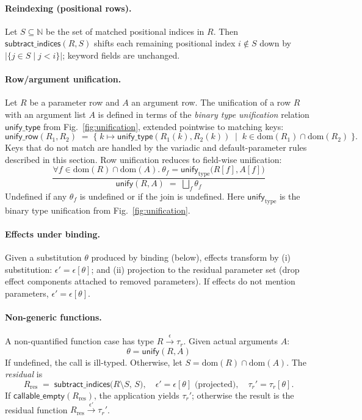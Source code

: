 \paragraph{Reindexing (positional rows).}
Let $S \subseteq \mathbb{N}$ be the set of matched positional indices in $R$.
Then $\mathsf{subtract\_indices}(R,S)$ shifts each remaining positional index $i\notin S$
down by $|\{j\in S \mid j<i\}|$; keyword fields are unchanged.

\paragraph{Row/argument unification.}
Let $R$ be a parameter row and $A$ an argument row. The unification of a row $R$ with an argument list $A$ is defined in terms of the \emph{binary type unification} relation $\mathsf{unify\_type}$ from Fig.~\ref{fig:unification}, extended pointwise to matching keys:
\[
\mathsf{unify\_row}(R_1, R_2) \;=\; \{ \; k \mapsto \mathsf{unify\_type}(R_1(k), R_2(k)) \;\mid\; k \in \mathrm{dom}(R_1) \cap \mathrm{dom}(R_2) \; \}.
\]
Keys that do not match are handled by the variadic and default-parameter rules described in this section.
Row unification reduces to
field-wise unification:
\[
\frac{
  \forall f \in \mathrm{dom}(R)\cap\mathrm{dom}(A).~ \theta_f = \mathsf{unify}_{\text{type}}\bigl(R[f],A[f]\bigr)
}{
  \mathsf{unify}(R,A) \;=\; \bigsqcup_{f} \theta_f
}
\]
Undefined if any $\theta_f$ is undefined or if the join is undefined.
Here $\mathsf{unify}_{\text{type}}$ is the binary type unification from Fig.~\ref{fig:unification}.

\paragraph{Effects under binding.}
Given a substitution $\theta$ produced by binding (below), effects transform by
(i) substitution: $\epsilon' = \epsilon[\theta]$; and (ii) projection to the residual
parameter set (drop effect components attached to removed parameters). If effects do
not mention parameters, $\epsilon'=\epsilon[\theta]$.

\paragraph{Non-generic functions.}
A non-quantified function case has type $R \xrightarrow{\epsilon} \tau_r$.
Given actual arguments $A$:
\[
\theta = \mathsf{unify}(R,A)
\]
If undefined, the call is ill-typed. Otherwise,
let $S=\mathrm{dom}(R)\cap\mathrm{dom}(A)$. The \emph{residual} is
\[
R_{\mathrm{res}} \;=\; \mathsf{subtract\_indices}\bigl(R\setminus S,\, S\bigr),\quad
\epsilon'=\epsilon[\theta]\text{ (projected)},\quad
\tau_r'=\tau_r[\theta].
\]
If $\mathsf{callable\_empty}(R_{\mathrm{res}})$, the application yields $\tau_r'$;
otherwise the result is the residual function $R_{\mathrm{res}} \xrightarrow{\epsilon'} \tau_r'$.

